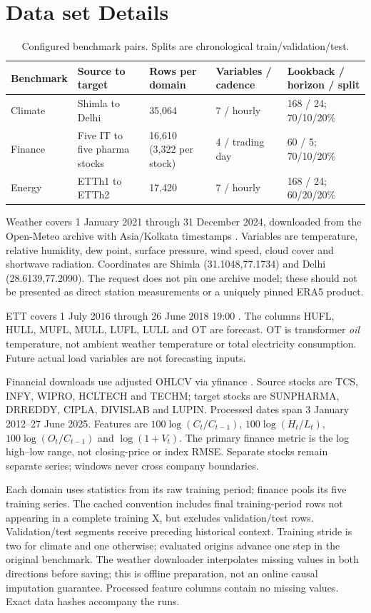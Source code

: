 \section{Data set Details}\label{sec:data}
\begin{longtable}{@{}p{}p{}p{}p{}p{}@{}}
\caption{Configured benchmark pairs. Splits are chronological train/validation/test.}\\\toprule
Benchmark&Source to target&Rows per domain&Variables / cadence&Lookback / horizon / split\\\midrule\endhead
Climate&Shimla to Delhi&35,064&7 / hourly&168 / 24; 70/10/20\%\\
Finance&Five IT to five pharma stocks&16,610 (3,322 per stock)&4 / trading day&60 / 5; 70/10/20\%\\
Energy&ETTh1 to ETTh2&17,420&7 / hourly&168 / 24; 60/20/20\%\\\bottomrule
\end{longtable}
Weather covers 1 January 2021 through 31 December 2024, downloaded from the Open-Meteo archive with Asia/Kolkata timestamps \citep{OpenMeteo}. Variables are temperature, relative humidity, dew point, surface pressure, wind speed, cloud cover and shortwave radiation. Coordinates are Shimla (31.1048,77.1734) and Delhi (28.6139,77.2090). The request does not pin one archive model; these should not be presented as direct station measurements or a uniquely pinned ERA5 product.

ETT covers 1 July 2016 through 26 June 2018 19:00 \citep{ETT}. The columns HUFL, HULL, MUFL, MULL, LUFL, LULL and OT are forecast. OT is transformer \emph{oil} temperature, not ambient weather temperature or total electricity consumption. Future actual load variables are not forecasting inputs.

Financial downloads use adjusted OHLCV via yfinance \citep{Finance}. Source stocks are TCS, INFY, WIPRO, HCLTECH and TECHM; target stocks are SUNPHARMA, DRREDDY, CIPLA, DIVISLAB and LUPIN. Processed dates span 3 January 2012--27 June 2025. Features are $100\log(C_t/C_{t-1})$, $100\log(H_t/L_t)$, $100\log(O_t/C_{t-1})$ and $\log(1+V_t)$. The primary finance metric is the log high--low range, not closing-price or index RMSE. Separate stocks remain separate series; windows never cross company boundaries.

Each domain uses statistics from its raw training period; finance pools its five training series. The cached convention includes final training-period rows not appearing in a complete training X, but excludes validation/test rows. Validation/test segments receive preceding historical context. Training stride is two for climate and one otherwise; evaluated origins advance one step in the original benchmark. The weather downloader interpolates missing values in both directions before saving; this is offline preparation, not an online causal imputation guarantee. Processed feature columns contain no missing values. Exact data hashes accompany the runs.

